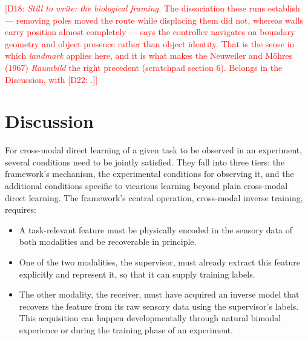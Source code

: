 \documentclass[11pt]{article}
\newcommand{\dnote}[2][]{\textcolor{red}{[D#1: #2]}}
\begin{document}
\dnote[18]{\emph{Still to write: the biological framing.} The dissociation these runs establish --- removing poles moved the route while displacing them did not, whereas walls carry position almost completely --- says the controller navigates on boundary geometry and object presence rather than object identity. That is the sense in which \emph{landmark} applies here, and it is what makes the Neuweiler and M\"ohres (1967) \emph{Raumbild} the right precedent (scratchpad section 6). Belongs in the Discussion, with \dnote[22].}

\section{Discussion}



For cross-modal direct learning of a given task to be observed in an experiment, several conditions need to be jointly satisfied. They fall into three tiers: the framework's mechanism, the experimental conditions for observing it, and the additional conditions specific to vicarious learning beyond plain cross-modal direct learning. The framework's central operation, cross-modal inverse training, requires:
%
\begin{itemize}
\item[1] A task-relevant feature must be physically encoded in the sensory data of both modalities and be recoverable in principle.
\item[2] One of the two modalities, the supervisor, must already extract this feature explicitly and represent it, so that it can supply training labels.
\item[3] The other modality, the receiver, must have acquired an inverse model that recovers the feature from its raw sensory data using the supervisor's labels. This acquisition can happen developmentally through natural bimodal experience or during the training phase of an experiment.
\end{itemize}
\end{document}
